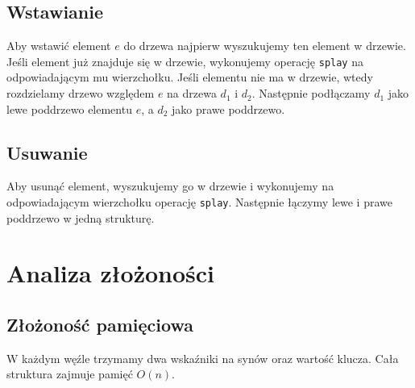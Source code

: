 \documentclass[declaration,shortabstract]{iithesis}
\theoremstyle{thm}
\theoremstyle{remark}
\theoremstyle{plain}
\theoremstyle{plain}
\theoremstyle{plain}
\begin{document}
\subsection{Wstawianie} 
Aby wstawić element \(e\) do drzewa najpierw wyszukujemy ten element w drzewie. Jeśli element już znajduje się w drzewie, wykonujemy operację \texttt{splay} na odpowiadającym mu wierzchołku. Jeśli elementu nie ma w drzewie, wtedy rozdzielamy drzewo względem \(e\) na drzewa \(d_1\) i \( d_2\). Następnie podłączamy \(d_1\) jako lewe poddrzewo elementu  \(e\), a \(d_2\) jako prawe poddrzewo.  

\subsection{Usuwanie} 
Aby usunąć element, wyszukujemy go w drzewie i wykonujemy na odpowiadającym wierzchołku operację \texttt{splay}. Następnie łączymy lewe i prawe poddrzewo w jedną strukturę.  

\section{Analiza złożoności}  

\subsection{Złożoność pamięciowa} 
W każdym węźle trzymamy dwa wskaźniki na synów oraz wartość klucza. Cała struktura zajmuje pamięć $ O(n)$.  
\end{document}
